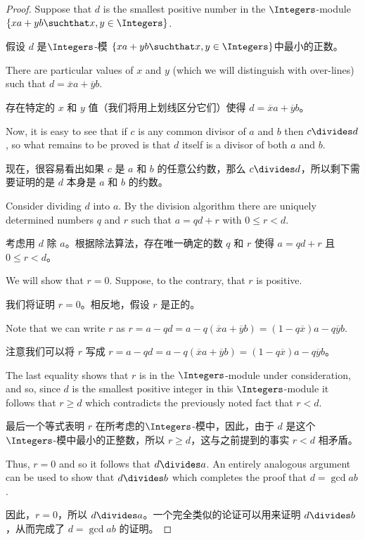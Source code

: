 \begin{proof}
      Suppose that $d$ is the smallest positive number
      in the $\Integers$-module $\{ xa + yb \suchthat x,y \in \Integers \}$.

      假设 $d$ 是$\Integers$-模 $\{ xa + yb \suchthat x,y \in \Integers \}$中最小的正数。

      There are particular values of $x$ and $y$ (which we will distinguish
      with over-lines) such that $d = \overline{x}a + \overline{y}b$.

      存在特定的 $x$ 和 $y$ 值（我们将用上划线区分它们）使得 $d = \overline{x}a + \overline{y}b$。

      Now, it
      is easy to see that if $c$ is any common divisor of $a$ and $b$ then
      $c \divides d$, so what remains to be proved is that $d$ itself is a divisor
      of both $a$ and $b$.

      现在，很容易看出如果 $c$ 是 $a$ 和 $b$ 的任意公约数，那么 $c \divides d$，所以剩下需要证明的是 $d$ 本身是 $a$ 和 $b$ 的约数。

      Consider dividing $d$ into $a$.  By the
      division algorithm there are uniquely determined numbers $q$ and $r$
      such that $a =qd + r$ with $0 \leq r < d$.

      考虑用 $d$ 除 $a$。根据除法算法，存在唯一确定的数 $q$ 和 $r$ 使得 $a =qd + r$ 且 $0 \leq r < d$。

      We will show that $r=0$.
      Suppose, to the contrary, that $r$ is positive.

      我们将证明 $r=0$。相反地，假设 $r$ 是正的。

      Note that we can
      write $r$ as $r = a - qd = a - q(\overline{x}a + \overline{y}b) = (1-q\overline{x})a - q\overline{y}b$.

      注意我们可以将 $r$ 写成 $r = a - qd = a - q(\overline{x}a + \overline{y}b) = (1-q\overline{x})a - q\overline{y}b$。

      The last equality shows that $r$ is in the
      $\Integers$-module under consideration, and so, since $d$ is the smallest
      positive integer in this $\Integers$-module it follows that $r \geq d$ which
      contradicts the previously noted fact that $r < d$.

      最后一个等式表明 $r$ 在所考虑的$\Integers$-模中，因此，由于 $d$ 是这个$\Integers$-模中最小的正整数，所以 $r \geq d$，这与之前提到的事实 $r < d$ 相矛盾。

      Thus, $r=0$ and so
      it follows that $d \divides a$.  An entirely analogous argument can be used
      to show that $d \divides b$ which completes the proof that $d = \gcd{a}{b}$.

      因此，$r=0$，所以 $d \divides a$。一个完全类似的论证可以用来证明 $d \divides b$，从而完成了 $d = \gcd{a}{b}$ 的证明。
\end{proof}



